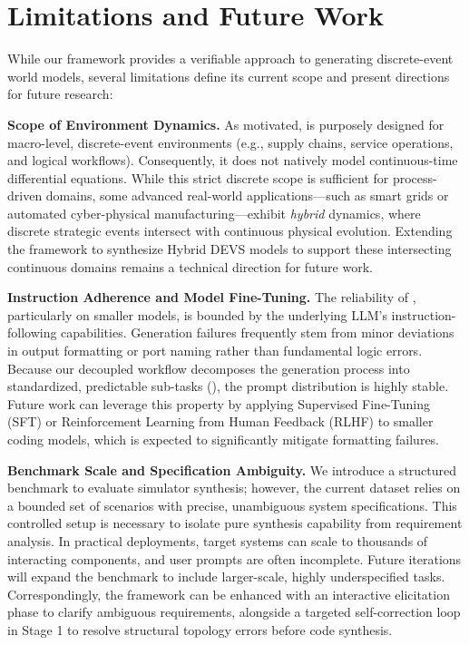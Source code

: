 \section{Limitations and Future Work}
\label{sec:limitations}

While our framework provides a verifiable approach to generating discrete-event world models, several limitations define its current scope and present directions for future research:

\textbf{Scope of Environment Dynamics.} As motivated, \methodname{} is purposely designed for macro-level, discrete-event environments (e.g., supply chains, service operations, and logical workflows). Consequently, it does not natively model continuous-time differential equations. While this strict discrete scope is sufficient for process-driven domains, some advanced real-world applications—such as smart grids or automated cyber-physical manufacturing—exhibit \emph{hybrid} dynamics, where discrete strategic events intersect with continuous physical evolution. Extending the framework to synthesize Hybrid DEVS models to support these intersecting continuous domains remains a technical direction for future work.

\textbf{Instruction Adherence and Model Fine-Tuning.} The reliability of \methodname{}, particularly on smaller models, is bounded by the underlying LLM's instruction-following capabilities. Generation failures frequently stem from minor deviations in output formatting or port naming rather than fundamental logic errors. Because our decoupled workflow decomposes the generation process into standardized, predictable sub-tasks (\modelplan{}), the prompt distribution is highly stable. Future work can leverage this property by applying Supervised Fine-Tuning (SFT) or Reinforcement Learning from Human Feedback (RLHF) to smaller coding models, which is expected to significantly mitigate formatting failures.

\textbf{Benchmark Scale and Specification Ambiguity.} We introduce a structured benchmark to evaluate simulator synthesis; however, the current dataset relies on a bounded set of scenarios with precise, unambiguous system specifications. This controlled setup is necessary to isolate pure synthesis capability from requirement analysis. In practical deployments, target systems can scale to thousands of interacting components, and user prompts are often incomplete. Future iterations will expand the benchmark to include larger-scale, highly underspecified tasks. Correspondingly, the framework can be enhanced with an interactive elicitation phase to clarify ambiguous requirements, alongside a targeted self-correction loop in Stage 1 to resolve structural topology errors before code synthesis.